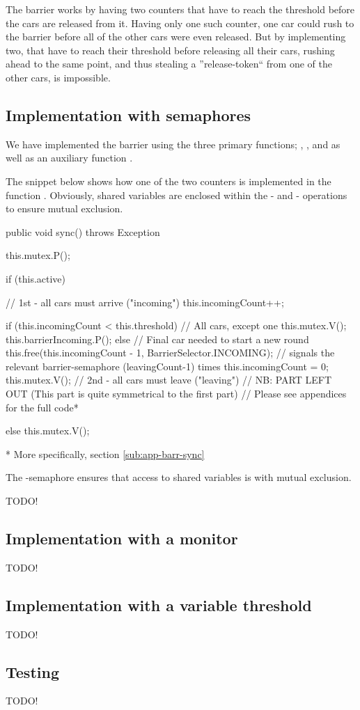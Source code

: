 

The barrier works by having two counters that have to reach the threshold before the cars are released from it. Having only one such counter, one car could rush to the barrier before all of the other cars were even released. But by implementing two, that have to reach their threshold before releasing all their cars, rushing ahead to the same point, and thus stealing a ''release-token`` from one of the other cars, is impossible.


\subsection{Implementation with semaphores}
\label{sub:bar-sema}
We have implemented the barrier using the three primary functions; , , and  as well as an auxiliary function .

The snippet below shows how one of the two counters is implemented in the function . Obviously, shared variables are enclosed within the - and - operations to ensure mutual exclusion.

\begin{java}
public void sync() throws Exception {
	this.mutex.P();

	if (this.active) {
		// 1st - all cars must arrive ("incoming")
		this.incomingCount++;

		if (this.incomingCount < this.threshold) { // All cars, except one
			this.mutex.V();
			this.barrierIncoming.P();
		} else { // Final car needed to start a new round
			this.free(this.incomingCount - 1, BarrierSelector.INCOMING);
			// signals the relevant barrier-semaphore (leavingCount-1) times
			this.incomingCount = 0;
			this.mutex.V();
		}
		// 2nd - all cars must leave ("leaving")
		// NB: PART LEFT OUT (This part is quite symmetrical to the first part)
		// Please see appendices for the full code*

	} else 
		this.mutex.V();
}
\end{java}
\begin{center}
* More specifically, section \ref{sub:app-barr-sync}
\end{center}


The -semaphore ensures that access to shared variables is with mutual exclusion.


TODO!

\subsection{Implementation with a monitor}
\label{sub:bar-moni}
TODO!

\subsection{Implementation with a variable threshold}
\label{sub:bar-thres}
TODO!


\subsection{Testing}
\label{sub:bar-test}
TODO!
